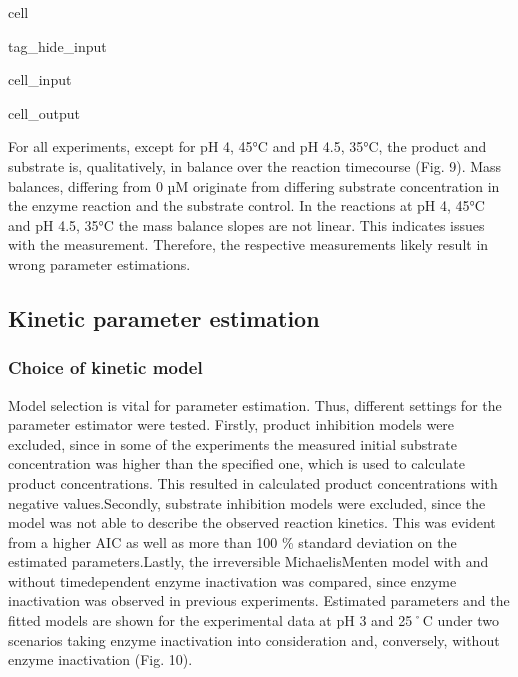 \documentclass[letterpaper,12pt,english]{jupyterBook}
\begin{document}
\begin{sphinxuseclass}{cell}
\begin{sphinxuseclass}{tag_hide_input}
\begin{sphinxVerbatimInput}
\begin{sphinxuseclass}{cell_input}
\end{sphinxuseclass}\end{sphinxVerbatimInput}
\begin{sphinxVerbatimOutput}

\begin{sphinxuseclass}{cell_output}
\noindent{}

\end{sphinxuseclass}\end{sphinxVerbatimOutput}

\end{sphinxuseclass}
\end{sphinxuseclass}
\sphinxAtStartPar
{}

\sphinxAtStartPar
For all experiments, except for pH 4, 45°C and pH 4.5, 35°C, the product and substrate is, qualitatively, in balance over the reaction time\sphinxhyphen{}course (Fig. 9). Mass balances, differing from 0 µM originate from differing substrate concentration in the enzyme reaction and the substrate control. In the reactions at pH 4, 45°C and pH 4.5, 35°C the mass balance slopes are not linear. This indicates issues with the measurement. Therefore, the respective measurements likely result in wrong parameter estimations.


\subsection{Kinetic parameter estimation}
\label{\detokenize{scenarios/SLAC_kinetic_characterization:kinetic-parameter-estimation}}

\subsubsection{Choice of kinetic model}
\label{\detokenize{scenarios/SLAC_kinetic_characterization:choice-of-kinetic-model}}
\sphinxAtStartPar
Model selection is vital for parameter estimation. Thus, different settings for the parameter estimator were tested. Firstly, product inhibition models were excluded, since in some of the experiments the measured initial substrate concentration was higher than the specified one, which is used to calculate product concentrations. This resulted in calculated product concentrations with negative values.Secondly, substrate inhibition models were excluded, since the model was not able to describe the observed reaction kinetics. This was evident from a higher AIC as well as more than 100 \% standard deviation on the estimated parameters.Lastly, the irreversible Michaelis\sphinxhyphen{}Menten model with and without time\sphinxhyphen{}dependent enzyme inactivation was compared, since enzyme inactivation was observed in previous experiments. Estimated parameters and the fitted models are shown for the experimental data at pH 3 and 25˚C under two scenarios \sphinxhyphen{} taking enzyme inactivation into consideration and, conversely, without enzyme inactivation (Fig. 10).
\end{document}
